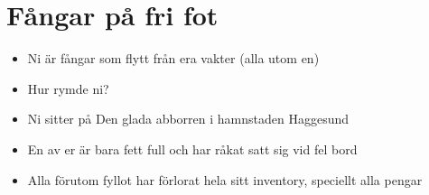 \section*{Fångar på fri fot}

\begin{itemize}
	\item Ni är fångar som flytt från era vakter (alla utom en)
	\item Hur rymde ni?
	\item Ni sitter på Den glada abborren i hamnstaden Haggesund
	\item En av er är bara fett full och har råkat satt sig vid fel bord
	\item Alla förutom fyllot har förlorat hela sitt inventory, speciellt alla pengar
\end{itemize}